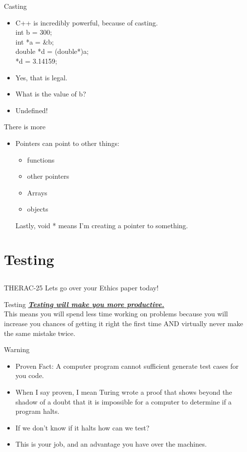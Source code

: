 \documentclass{beamer}
\begin{document}
\begin{frame}{Casting}
\begin{itemize}
\item C++ is incredibly powerful, because of casting.\\
int b = 300; \\
int *a = \&b; \\
double *d = (double*)a; \\
*d = 3.14159;
\item Yes, that is legal. 
\item What is the value of b?
\item <2-> Undefined!
\end{itemize}
\end{frame}

\begin{frame}{There is more}
\begin{itemize}
\item Pointers can point to other things:
\begin{itemize}
\item functions
\item other pointers
\item Arrays
\item objects
\end{itemize}
Lastly, void * means I'm creating a pointer to something.
\end{itemize}
\end{frame}

\section{Testing}
\subsection{}

\begin{frame}{THERAC-25}
Lets go over your Ethics paper today!
\end{frame}

\begin{frame}{Testing}
\underline{\textbf{\textit{Testing will make you more productive.}}} \\
This means you will spend less time working on problems because you will increase you chances of getting it right the first time AND virtually never make the same mistake twice.
\end{frame}

\begin{frame}{Warning}
\begin{itemize}
\item Proven Fact: A computer program cannot sufficient generate test cases for you code.
\item When I say proven, I mean Turing wrote a proof that shows beyond the shadow of a doubt that it is impossible for a computer to determine if a program halts.
\item If we don't know if it halts how can we test?
\item This is your job, and an advantage you have over the machines.
\end{itemize}
\end{frame}
\end{document}
